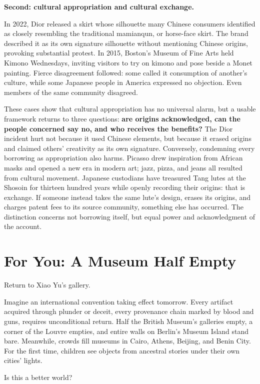 \textbf{Second: cultural appropriation and cultural exchange.}

In 2022, Dior released a skirt whose silhouette many Chinese consumers identified as closely resembling the traditional mamianqun, or horse-face skirt. The brand described it as its own signature silhouette without mentioning Chinese origins, provoking substantial protest. In 2015, Boston's Museum of Fine Arts held Kimono Wednesdays, inviting visitors to try on kimono and pose beside a Monet painting. Fierce disagreement followed: some called it consumption of another's culture, while some Japanese people in America expressed no objection. Even members of the same community disagreed.

These cases show that cultural appropriation has no universal alarm, but a usable framework returns to three questions: \textbf{are origins acknowledged, can the people concerned say no, and who receives the benefits?} The Dior incident hurt not because it used Chinese elements, but because it erased origins and claimed others' creativity as its own signature. Conversely, condemning every borrowing as appropriation also harms. Picasso drew inspiration from African masks and opened a new era in modern art; jazz, pizza, and jeans all resulted from cultural movement. Japanese custodians have treasured Tang lutes at the Shosoin for thirteen hundred years while openly recording their origins: that is exchange. If someone instead takes the same lute's design, erases its origins, and charges patent fees to its source community, something else has occurred. The distinction concerns not borrowing itself, but equal power and acknowledgment of the account.

\section{For You: A Museum Half Empty}
Return to Xiao Yu's gallery.

Imagine an international convention taking effect tomorrow. Every artifact acquired through plunder or deceit, every provenance chain marked by blood and guns, requires unconditional return. Half the British Museum's galleries empty, a corner of the Louvre empties, and entire walls on Berlin's Museum Island stand bare. Meanwhile, crowds fill museums in Cairo, Athens, Beijing, and Benin City. For the first time, children see objects from ancestral stories under their own cities' lights.

Is this a better world?

